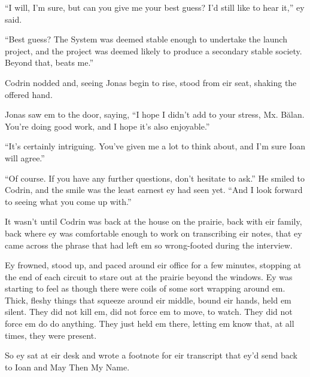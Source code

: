 ``I will, I'm sure, but can you give me your best guess? I'd still like to hear it,'' ey said.

``Best guess? The System was deemed stable enough to undertake the launch project, and the project was deemed likely to produce a secondary stable society. Beyond that, beats me.''

Codrin nodded and, seeing Jonas begin to rise, stood from eir seat, shaking the offered hand.

Jonas saw em to the door, saying, ``I hope I didn't add to your stress, Mx. Bălan. You're doing good work, and I hope it's also enjoyable.''

``It's certainly intriguing. You've given me a lot to think about, and I'm sure Ioan will agree.''

``Of course. If you have any further questions, don't hesitate to ask.'' He smiled to Codrin, and the smile was the least earnest ey had seen yet. ``And I look forward to seeing what you come up with.''

It wasn't until Codrin was back at the house on the prairie, back with eir family, back where ey was comfortable enough to work on transcribing eir notes, that ey came across the phrase that had left em so wrong-footed during the interview.

Ey frowned, stood up, and paced around eir office for a few minutes, stopping at the end of each circuit to stare out at the prairie beyond the windows. Ey was starting to feel as though there were coils of some sort wrapping around em. Thick, fleshy things that squeeze around eir middle, bound eir hands, held em silent. They did not kill em, did not force em to move, to watch. They did not force em do do anything. They just held em there, letting em know that, at all times, they were present.

So ey sat at eir desk and wrote a footnote for eir transcript that ey'd send back to Ioan and May Then My Name.

